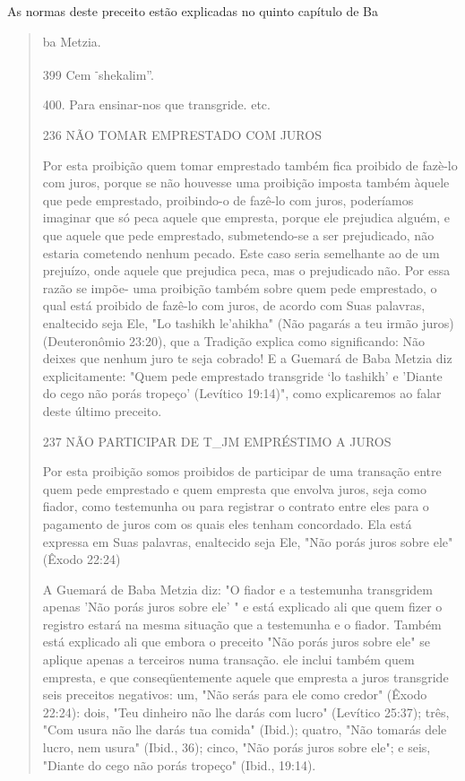 As normas deste preceito estão explicadas no quinto capítulo de Ba

\begin{quote}
ba Metzia.

399 Cem \textsuperscript{-}shekalim''.

400. Para ensinar-nos que transgride. etc.

236 NÃO TOMAR EMPRESTADO COM JUROS

Por esta proibição quem tomar emprestado também fica proibido de fazè-lo
com juros, porque se não houvesse uma proibição imposta também àquele
que pede emprestado, proibindo-o de fazê-lo com juros, poderíamos
imaginar que só peca aquele que empresta, porque ele prejudica alguém, e
que aquele que pede emprestado, submetendo-se a ser prejudicado, não
estaria co­metendo nenhum pecado. Este caso seria semelhante ao de um
prejuízo, onde aquele que prejudica peca, mas o prejudicado não. Por
essa razão se impõe- uma proibição também sobre quem pede emprestado, o
qual está proibido de fazê-lo com juros, de acordo com Suas palavras,
enaltecido seja Ele, "Lo tashikh le'ahikha" (Não pagarás a teu irmão
juros) (Deuteronômio 23:20), que a Tradi­ção explica como significando:
Não deixes que nenhum juro te seja cobrado! E a Guemará de Baba Metzia
diz explicitamente: "Quem pede emprestado trans­gride `lo tashikh' e
'Diante do cego não porás tropeço' (Levítico 19:14)", como explicaremos
ao falar deste último preceito.

237 NÃO PARTICIPAR DE T\_JM EMPRÉSTIMO A JUROS

Por esta proibição somos proibidos de participar de uma transação entre
quem pede emprestado e quem empresta que envolva juros, seja como
fiador, como testemunha ou para registrar o contrato entre eles para o
paga­mento de juros com os quais eles tenham concordado. Ela está
expressa em Suas palavras, enaltecido seja Ele, "Não porás juros sobre
ele" (Êxodo 22:24)

A Guemará de Baba Metzia diz: "O fiador e a testemunha transgri­dem
apenas 'Não porás juros sobre ele' " e está explicado ali que quem fizer
o registro estará na mesma situação que a testemunha e o fiador. Também
está explicado ali que embora o preceito "Não porás juros sobre ele" se
aplique apenas a terceiros numa transação. ele inclui também quem
empresta, e que conseqüentemente aquele que empresta a juros transgride
seis preceitos nega­tivos: um, "Não serás para ele como credor" (Êxodo
22:24): dois, "Teu dinhei­ro não lhe darás com lucro" (Levítico 25:37);
três, "Com usura não lhe darás tua comida" (Ibid.); quatro, "Não tomarás
dele lucro, nem usura" (Ibid., 36); cinco, "Não porás juros sobre ele";
e seis, "Diante do cego não porás tropeço" (Ibid., 19:14).


\end{quote}
